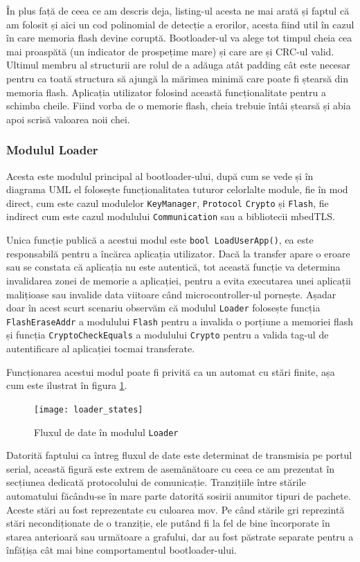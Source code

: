 \documentclass[12pt,a4paper,titlepage]{report}
\begin{document}
În plus față de ceea ce am descris deja, listing-ul acesta ne mai arată și faptul că am folosit și aici un cod polinomial de detecție a erorilor, acesta fiind util în cazul în care memoria flash devine coruptă. Bootloader-ul va alege tot timpul cheia cea mai proaspătă (un indicator de prospețime mare) și care are și CRC-ul valid. Ultimul membru al structurii are rolul de a adăuga atât padding cât este necesar pentru ca toată structura să ajungă la mărimea minimă care poate fi ștearsă din memoria flash. Aplicația utilizator folosind această funcționalitate pentru a schimba cheile. Fiind vorba de o memorie flash, cheia trebuie întâi ștearsă și abia apoi scrisă valoarea noii chei.

\subsubsection{Modulul Loader}

Acesta este modulul principal al bootloader-ului, după cum se vede și în diagrama UML el folosește funcționalitatea tuturor celorlalte module, fie în mod direct, cum este cazul modulelor \texttt{KeyManager}, \texttt{Protocol} \texttt{Crypto} și \texttt{Flash}, fie indirect cum este cazul modulului \texttt{Communication} sau a bibliotecii mbedTLS.

Unica funcție publică a acestui modul este \texttt{bool LoadUserApp()}, ea este responsabilă pentru a încărca aplicația utilizator. Dacă la transfer apare o eroare sau se constata că aplicația nu este autentică, tot această funcție va determina invalidarea zonei de memorie a aplicației, pentru a evita executarea unei aplicații malițioase sau invalide data viitoare când microcontroller-ul pornește. Așadar doar în acest scurt scenariu observăm că modulul \texttt{Loader} folosește funcția \texttt{FlashEraseAddr} a modulului \texttt{Flash} pentru a invalida o porțiune a memoriei flash și funcția \texttt{CryptoCheckEquals} a modulului \texttt{Crypto} pentru a valida tag-ul de autentificare al aplicației tocmai transferate.

Funcționarea acestui modul poate fi privită ca un automat cu stări finite, așa cum este ilustrat în figura \ref{loaderStates}.

\begin{figure}[h]
    \centering
    \texttt{[image: loader\_states]}
    \caption{Fluxul de date în modulul \texttt{Loader}}
    \label{loaderStates}
\end{figure}

Datorită faptului ca întreg fluxul de date este determinat de transmisia pe portul serial, această figură este extrem de asemănătoare cu ceea ce am prezentat în secțiunea dedicată protocolului de comunicație. Tranzițiile între stările automatului făcându-se în mare parte datorită sosirii anumitor tipuri de pachete. Aceste stări au fost reprezentate cu culoarea mov. Pe când stările gri reprezintă stări necondiționate de o tranziție, ele putând fi la fel de bine încorporate în starea anterioară sau următoare a grafului, dar au fost păstrate separate pentru a înfățișa cât mai bine comportamentul bootloader-ului.
\end{document}
